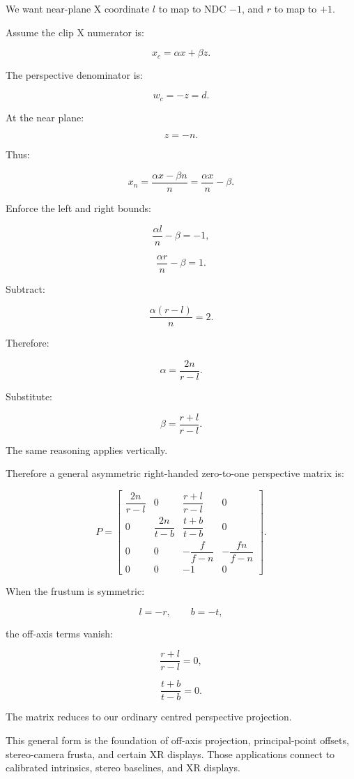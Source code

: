 We want near-plane X coordinate \(l\) to map to NDC \(-1\), and \(r\) to map to \(+1\).

Assume the clip X numerator is:

\[
 x_c=\alpha x+\beta z.
\]

The perspective denominator is:

\[
 w_c=-z=d.
\]

At the near plane:

\[
 z=-n.
\]

Thus:

\[
 x_n=\frac{\alpha x-\beta n}{n} = \frac{\alpha x}{n}-\beta.
\]

Enforce the left and right bounds:

\[
 \frac{\alpha l}{n}-\beta=-1,
\]

\[
 \frac{\alpha r}{n}-\beta=1.
\]

Subtract:

\[
 \frac{\alpha(r-l)}n=2.
\]

Therefore:

\[
 \boxed{ \alpha=\frac{2n}{r-l} }.
\]

Substitute:

\[
 \boxed{ \beta=\frac{r+l}{r-l} }.
\]

The same reasoning applies vertically.

Therefore a general asymmetric right-handed zero-to-one perspective matrix is:

\[
 \boxed{ P= \begin{bmatrix} \dfrac{2n}{r-l}&0&\dfrac{r+l}{r-l}&0\\ 0&\dfrac{2n}{t-b}&\dfrac{t+b}{t-b}&0\\ 0&0&-\dfrac f{f-n}&-\dfrac{fn}{f-n}\\ 0&0&-1&0 \end{bmatrix} }.
\]

When the frustum is symmetric:

\[
 l=-r,\qquad b=-t,
\]

the off-axis terms vanish:

\[
 \frac{r+l}{r-l}=0,
\]

\[
 \frac{t+b}{t-b}=0.
\]

The matrix reduces to our ordinary centred perspective projection.

This general form is the foundation of off-axis projection, principal-point offsets, stereo-camera frusta, and certain XR displays. Those applications connect to calibrated intrinsics, stereo baselines, and XR displays.

